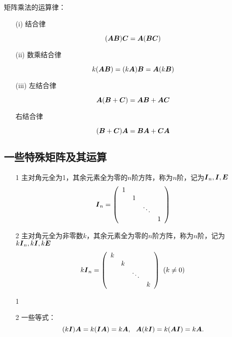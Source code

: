 \begin{frame}
矩阵乘法的运算律：
\begin{itemize}
\item[(i)] 结合律
\item[] $$ (\boldsymbol{A}\boldsymbol{B})\boldsymbol{C} = \boldsymbol{A}(\boldsymbol{B}\boldsymbol{C})$$
\item[(ii)] 数乘结合律
\item[] $$ k(\boldsymbol{A}\boldsymbol{B}) = (k\boldsymbol{A})\boldsymbol{B} = \boldsymbol{A}(k\boldsymbol{B})$$
\item[(iii)] 左结合律
\item[] $$ \boldsymbol{A}(\boldsymbol{B}+\boldsymbol{C}) = \boldsymbol{A}\boldsymbol{B}+\boldsymbol{A}\boldsymbol{C}$$
\item[] 右结合律
\item[] $$ (\boldsymbol{B}+\boldsymbol{C})\boldsymbol{A} = \boldsymbol{B}\boldsymbol{A}+\boldsymbol{C}\boldsymbol{A}$$
  
\end{itemize}
\end{frame}


\subsection{一些特殊矩阵及其运算}
\begin{frame}
% 
\begin{dingyi}[单位矩阵与数量矩阵]
  \begin{itemize}
  \item[1] 主对角元全为1，其余元素全为零的$n$阶方阵，称为$n$阶，记为$\boldsymbol{I}_n, \boldsymbol{I}, \boldsymbol{E}$
    $$
    \boldsymbol{I}_n = \left(
      \begin{array}{cccc}
        1 & & &\\
          & 1 & & \\
          & & \ddots & \\
          & & & 1
      \end{array}
    \right)
    $$ 
  \item[2] 主对角元全为非零数$k$，其余元素全为零的$n$阶方阵，称为$n$阶，记为$k\boldsymbol{I}_n, k\boldsymbol{I}, k\boldsymbol{E}$
    $$
    k\boldsymbol{I}_n = \left(
      \begin{array}{cccc}
        k & & &\\
          & k & & \\
          & & \ddots & \\
          & & & k
      \end{array}
    \right)~(k\ne 0)
    $$
  \end{itemize}
\end{dingyi}
\end{frame}

\begin{frame}
% 
\begin{zhu}
  \begin{itemize}
  \item[1] 
  \item[2] 一些等式：
    $$
    (k\boldsymbol{I}) \boldsymbol{A} = k(\boldsymbol{I}\boldsymbol{A}) = k\boldsymbol{A}, ~~
    \boldsymbol{A}(k\boldsymbol{I}) = k(\boldsymbol{A}\boldsymbol{I}) = k\boldsymbol{A}.
    $$
  \end{itemize}
\end{zhu}
\end{frame}

